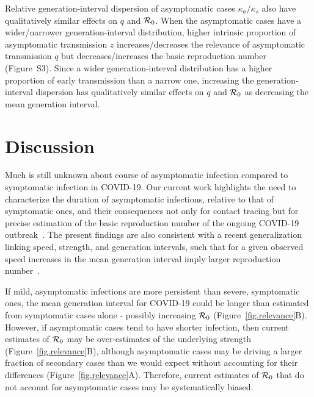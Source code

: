 
Relative generation-interval dispersion of asymptomatic cases $\kappa_a/\kappa_s$ also have qualitatively similar effects on $q$ and ${\cal{R}}_0$.
When the asymptomatic cases have a wider/narrower generation-interval distribution, higher intrinsic proportion of asymptomatic transmission $z$ increases/decreases the relevance of asymptomatic transmission $q$ but decreases/increases the basic reproduction number (Figure~S3).
Since a wider generation-interval distribution has a higher proportion of early transmission than a narrow one, increasing the generation-interval dispersion has qualitatively similar effects on $q$ and ${\cal{R}}_0$ as decreasing the mean generation interval.

\section{Discussion}

Much is still unknown about course of asymptomatic infection compared to symptomatic infection in COVID-19. 
Our current work highlights the need to characterize the duration of asymptomatic infections, relative to that of symptomatic ones, and their consequences not only for contact tracing but for precise estimation of the basic reproduction number of the ongoing COVID-19 outbreak~\citep{park_preprint}.
The present findings are also consistent with a recent generalization linking speed, strength, and generation intervals, such that for a given observed speed increases in the mean generation interval imply larger reproduction number~\citep{park_2019practical}.

If mild, asymptomatic infections are more persistent than severe, symptomatic ones, the mean generation interval for COVID-19 could be longer than estimated from symptomatic cases alone - possibly increasing ${\cal{R}}_0$ (Figure~\ref{fig.relevance}B).
However, if asymptomatic cases tend to have shorter infection, then current estimates of ${\cal{R}}_0$ may be over-estimates of the underlying strength (Figure~\ref{fig.relevance}B), although asymptomatic cases may be driving a larger fraction of secondary cases than we would expect without accounting for their differences (Figure~\ref{fig.relevance}A).
Therefore, current estimates of ${\cal{R}}_0$ that do not account for asymptomatic cases may be systematically biased.

